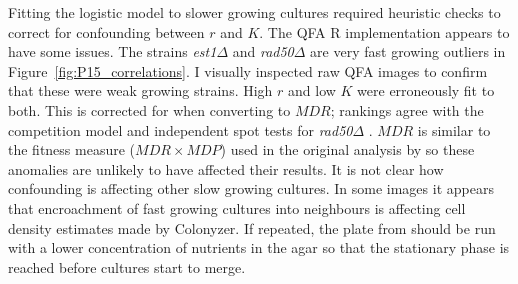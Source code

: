 Fitting the logistic model to slower growing cultures required
heuristic checks to correct for confounding between \(r\) and
\(K\). The QFA R implementation appears to have some issues. The
strains \textit{est1\(\Delta\)} and \textit{rad50\(\Delta\)} are very
fast growing outliers in Figure~\ref{fig:P15_correlations}. I visually
inspected raw QFA images to confirm that these were weak growing
strains. High \(r\) and low \(K\) were erroneously fit to both. This
is corrected for when converting to \(MDR\); rankings agree with the
competition model and independent spot tests for
\textit{rad50\(\Delta\)} \citep{zubko2004exo1}. \(MDR\) is similar to
the fitness measure (\(MDR \times MDP\)) used in the original analysis
by \citet{Addinall2011} so these anomalies are unlikely to have
affected their results. It is not clear how confounding is affecting
other slow growing cultures. In some images it appears that
encroachment of fast growing cultures into neighbours is affecting
cell density estimates made by Colonyzer. If repeated, the plate from
\citet{Addinall2011} should be run with a lower concentration of
nutrients in the agar so that the stationary phase is reached before
cultures start to merge.


